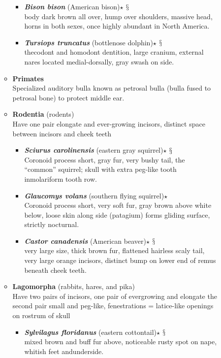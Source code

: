 \documentclass[a4paper,12pt]{article}
\begin{document}
\begin{description}
\begin{itemize}
\begin{itemize}
\begin{itemize}
      \item{\textbf{\textit{Bison bison}} (American bison)$\star$ $\mathsection$} \\ body dark brown all over, hump over shoulders, massive head, horns in both sexes, once highly abundant in North America.
      \item{\textbf{\textit{Tursiops truncatus}} (bottlenose dolphin)$\star$ $\mathsection$} \\ thecodont and homodont dentition, large cranium, external nares located medial-dorsally, gray swash on side.
    \end{itemize}  
    \item{\textbf{Primates}} \\ Specialized auditory bulla known as petrosal bulla (bulla fused to petrosal bone) to protect middle ear. 
    \item{\textbf{Rodentia} (rodents)} \\ Have one pair elongate and ever-growing incisors, distinct space between incisors and cheek teeth
    \begin{itemize}
      \item{\textbf{\textit{Sciurus carolinensis}} (eastern gray squirrel)$\star$ $\mathsection$} \\ Coronoid process short, gray fur, very bushy tail, the “common” squirrel; skull with extra peg-like tooth inmolariform tooth row. 
      \item{\textbf{\textit{Glaucomys volans}} (southern flying squirrel)$\star$} \\ Coronoid process short, very soft fur, gray brown above white below, loose skin along side (patagium) forms gliding surface, strictly nocturnal. 
      \item{\textbf{\textit{Castor canadensis}} (American beaver)$\star$ $\mathsection$} \\ very large size, thick brown fur, flattened hairless scaly tail, very large orange incisors, distinct bump on lower end of remus beneath cheek teeth.
    \end{itemize}
    \item{\textbf{Lagomorpha} (rabbits, hares, and pika)} \\ Have two pairs of incisors, one pair of evergrowing and elongate the second pair small and peg-like, fenestrations = latice-like openings on rostrum of skull
    \begin{itemize}
      \item{\textbf{\textit{Sylvilagus floridanus}} (eastern cottontail)$\star$ $\mathsection$} \\ mixed brown and buff fur above, noticeable rusty spot on nape, whitish feet andunderside.
    \end{itemize}
  \end{itemize}
\end{itemize}
\end{description}
\end{document}

